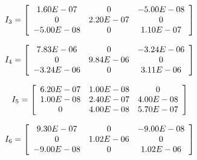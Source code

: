 \begin{equation*}
    \hspace{-10mm}
    I_3 = \left[
        \begin{array}{ccc}
        
        1.60E-07&0&-5.00E-08\\
        0&2.20E-07&0\\
        -5.00E-08&0&1.10E-07\\
        
        \end{array}\right]\hspace{10mm}
\end{equation*}

\begin{equation*}
    \hspace{-10mm}
    I_4 = \left[
        \begin{array}{ccc}
        
        7.83E-06&0&-3.24E-06\\
        0&9.84E-06&0\\
        -3.24E-06&0&3.11E-06\\
        
        \end{array}\right]\hspace{10mm}
\end{equation*}

\begin{equation*}
    \hspace{-10mm}
    I_5 = \left[
        \begin{array}{ccc}

        6.20E-07&1.00E-08&0\\
        1.00E-08&2.40E-07&4.00E-08\\
        0&4.00E-08&5.70E-07\\
        
        \end{array}\right]\hspace{10mm}
\end{equation*}

\begin{equation*}
    \hspace{-10mm}
    I_6 = \left[
        \begin{array}{ccc}
        
        9.30E-07&0&-9.00E-08\\
        0&1.02E-06&0\\
        -9.00E-08&0&1.02E-06\\
        
        \end{array}\right]\hspace{10mm}
\end{equation*}